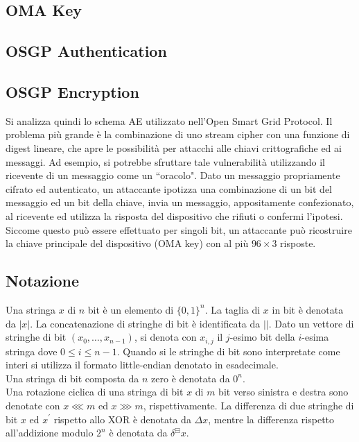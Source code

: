 \subsection{OMA Key}
\subsection{OSGP Authentication}
\subsection{OSGP Encryption}
Si analizza quindi lo schema AE utilizzato nell'Open Smart Grid Protocol.
Il problema più grande è la combinazione di uno stream cipher con una funzione di digest lineare, che apre le possibilità per attacchi alle chiavi crittografiche ed ai messaggi. Ad esempio, si potrebbe sfruttare tale vulnerabilità utilizzando il ricevente di un messaggio come un ``oracolo". Dato un messaggio propriamente cifrato ed autenticato, un attaccante ipotizza una combinazione di un bit del messaggio ed un bit della chiave, invia un messaggio, appositamente confezionato, al ricevente ed utilizza la risposta del  dispositivo che rifiuti o confermi l'ipotesi. Siccome questo può essere effettuato per singoli bit, un attaccante può ricostruire la chiave principale del dispositivo (OMA key) con al più $96 \times 3$ risposte.
\subsection{Notazione}
Una stringa $x$ di $n$ bit è un elemento di $\{0,1\}^n$. La taglia di $x$ in bit è denotata da $|x|$. La concatenazione di stringhe di bit è identificata da $||$. Dato un vettore di stringhe di bit $(x_0, \ldots, x_{n-1})$, si denota con $x_{i,j}$ il $j$-esimo bit della $i$-esima stringa dove $0 \leq i \leq n-1$. Quando si le stringhe di bit sono interpretate come interi si utilizza il formato little-endian denotato in esadecimale.\\
Una stringa di bit composta da $n$ zero è denotata da $0^n$.\\
Una rotazione ciclica di una stringa di bit $x$ di $m$ bit verso sinistra e destra sono denotate con $x \lll m$ ed $x \ggg m$, rispettivamente. La differenza di due stringhe di bit $x$ ed $x^\prime$ rispetto allo XOR è denotata da $\Delta x$, mentre la differenza rispetto all'addizione modulo $2^n$ è denotata da $\delta^{\boxminus}x$.
